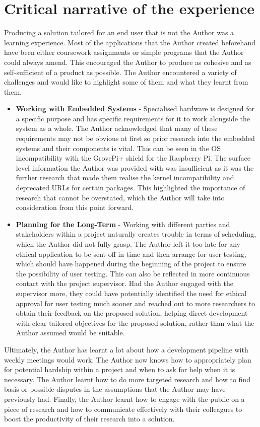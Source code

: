 \section{Critical narrative of the experience}\label{sec:challenges}
Producing a solution tailored for an end user that is not the Author was a learning experience. Most of the applications that the Author created beforehand have been either coursework assignments or simple programs that the Author could always amend. This encouraged the Author to produce as cohesive and as self-sufficient of a product as possible. The Author encountered a variety of challenges and would like to highlight some of them and what they learnt from them.
\begin{itemize}
    \item \textbf{Working with Embedded Systems} - Specialised hardware is designed for a specific purpose and has specific requirements for it to work alongside the system as a whole. The Author acknowledged that many of these requirements may not be obvious at first so prior research into the embedded systems and their components is vital. This can be seen in the OS incompatibility with the GrovePi+ shield for the Raspberry Pi. The surface level information the Author was provided with was insufficient as it was the further research that made them realise the kernel incompatibility and deprecated URLs for certain packages. This highlighted the importance of research that cannot be overstated, which the Author will take into consideration from this point forward.  
    \item \textbf{Planning for the Long-Term} - Working with different parties and stakeholders within a project naturally creates trouble in terms of scheduling, which the Author did not fully grasp. The Author left it too late for any ethical application to be sent off in time and then arrange for user testing, which should have happened during the beginning of the project to ensure the possibility of user testing. This can also be reflected in more continuous contact with the project supervisor. Had the Author engaged with the supervisor more, they could have potentially identified the need for ethical approval for user testing much sooner and reached out to more researchers to obtain their feedback on the proposed solution, helping direct development with clear tailored objectives for the proposed solution, rather than what the Author assumed would be suitable.
\end{itemize}

Ultimately, the Author has learnt a lot about how a development pipeline with weekly meetings would work. The Author now knows how to appropriately plan for potential hardship within a project and when to ask for help when it is necessary. The Author learnt how to do more targeted research and how to find basis or possible disputes in the assumptions that the Author may have previously had. Finally, the Author learnt how to engage with the public on a piece of research and how to communicate effectively with their colleagues to boost the productivity of their research into a solution.

